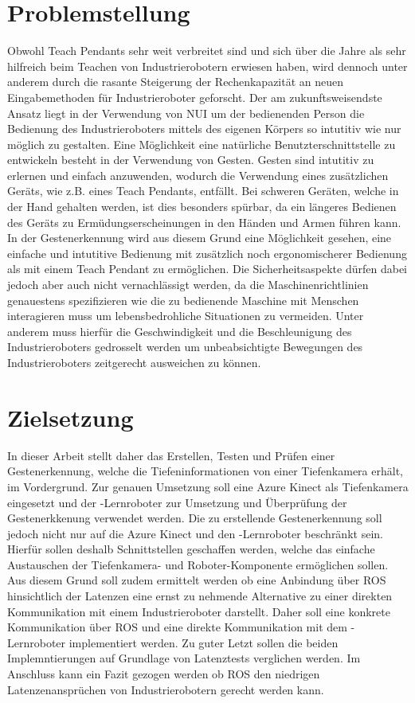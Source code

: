\section{Problemstellung}
Obwohl Teach Pendants sehr weit verbreitet sind und sich über die Jahre als sehr hilfreich beim Teachen von Industrierobotern erwiesen haben, wird dennoch unter anderem durch die rasante Steigerung der Rechenkapazität an neuen Eingabemethoden für Industrieroboter geforscht. Der am zukunftsweisendste Ansatz liegt in der Verwendung von NUI um der bedienenden Person die Bedienung des Industrieroboters mittels des eigenen Körpers so intutitiv wie nur möglich zu gestalten. Eine Möglichkeit eine natürliche Benutzterschnittstelle zu entwickeln besteht in der Verwendung von Gesten. Gesten sind intutitiv zu erlernen und einfach anzuwenden, wodurch die Verwendung eines zusätzlichen Geräts, wie z.B. eines Teach Pendants, entfällt. Bei schweren Geräten, welche in der Hand gehalten werden, ist dies besonders spürbar, da ein längeres Bedienen des Geräts zu Ermüdungserscheinungen in den Händen und Armen führen kann. In der Gestenerkennung wird aus diesem Grund eine Möglichkeit gesehen, eine einfache und intutitive Bedienung mit zusätzlich noch ergonomischerer Bedienung als mit einem Teach Pendant zu ermöglichen. Die Sicherheitsaspekte dürfen dabei jedoch aber auch nicht vernachlässigt werden, da die Maschinenrichtlinien genauestens spezifizieren wie die zu bedienende Maschine mit Menschen interagieren muss um lebensbedrohliche Situationen zu vermeiden. Unter anderem muss hierfür die Geschwindigkeit und die Beschleunigung des Industrieroboters gedrosselt werden um unbeabsichtigte Bewegungen des Industrieroboters zeitgerecht ausweichen zu können.

\section{Zielsetzung} \label{sec:zielsetzung} %
In dieser Arbeit stellt daher das Erstellen, Testen und Prüfen einer Gestenerkennung, welche die Tiefeninformationen von einer Tiefenkamera erhält, im Vordergrund. Zur genauen Umsetzung soll eine Azure Kinect als Tiefenkamera eingesetzt und der -Lernroboter zur Umsetzung und Überprüfung der Gestenerkkenung verwendet werden. Die zu erstellende Gestenerkennung soll jedoch nicht nur auf die Azure Kinect und den -Lernroboter beschränkt sein. Hierfür sollen deshalb Schnittstellen geschaffen werden, welche das einfache Austauschen der Tiefenkamera- und Roboter-Komponente ermöglichen sollen. Aus diesem Grund soll zudem ermittelt werden ob eine Anbindung über ROS hinsichtlich der Latenzen eine ernst zu nehmende Alternative zu einer direkten Kommunikation mit einem Industrieroboter darstellt. Daher soll eine konkrete Kommunikation über ROS und eine direkte Kommunikation mit dem -Lernroboter implementiert werden. Zu guter Letzt sollen die beiden Implemntierungen auf Grundlage von Latenztests verglichen werden. Im Anschluss kann ein Fazit gezogen werden ob ROS den niedrigen Latenzenansprüchen von Industrierobotern gerecht werden kann.
